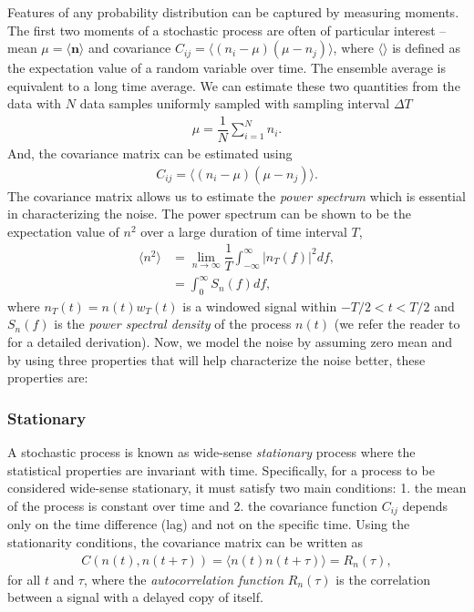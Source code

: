 Features of any probability distribution can be captured by measuring moments. The first two moments of a stochastic process are often of particular interest -- mean $\mu = \langle \textbf{n}\rangle$ and covariance $C_{ij} = \langle(n_i-\mu)(\mu-n_j)\rangle$, where $\langle\rangle$ is defined as the expectation value of a random variable over time. The ensemble average is equivalent to a long time average. We can estimate these two quantities from the data with $N$ data samples uniformly sampled with sampling interval $\Delta T$
\begin{align}
    \mu = \dfrac{1}{N}\sum_{i=1}^{N}n_{i}.
    \label{eq:mean-noise-series}
\end{align}
And, the covariance matrix can be estimated using
\begin{align}
    C_{ij} = \langle (n_{i} - \mu)(\mu - n_j) \rangle.
    \label{eq:covariance-noise-series}
\end{align}
The covariance matrix allows us to estimate the \textit{power spectrum} which is essential in characterizing the noise. The power spectrum can be shown to be the expectation value of $n^2$ over a large duration of time interval $T$,
\begin{align} 
   \langle n^2 \rangle &= \lim_{n\to\infty} \dfrac{1}{T} \int_{-\infty}^{\infty} |n_T(f)|^2 df,\\
   & = \int_0^{\infty} S_n(f) df,
\end{align}
where $n_T(t) = n(t)w_T(t)$ is a windowed signal within $-T/2 < t < T/2$ and $S_n(f)$ is the \textit{power spectral density} of the process $n(t)$ (we refer the reader to \cite{Allen:2005fk} for a detailed derivation). Now, we model the noise by assuming zero mean and by using three properties that will help characterize the noise better, these properties are: 

\subsubsection{Stationary}
A stochastic process is known as wide-sense \textit{stationary} process where the statistical properties are invariant with time. Specifically, for a process to be considered wide-sense stationary, it must satisfy two main conditions: 1. the mean of the process is constant over time and 2. the covariance function $C_{ij}$ depends only on the time difference (lag) and not on the specific time. Using the stationarity conditions, the covariance matrix can be written as
\begin{align}
    C(n(t), n(t+\tau)) = \langle n(t)n(t+\tau) \rangle = R_n(\tau),
\end{align}
for all $t$ and $\tau$, where the \textit{autocorrelation function} $R_n(\tau)$ is the correlation between a signal with a delayed copy of itself.

